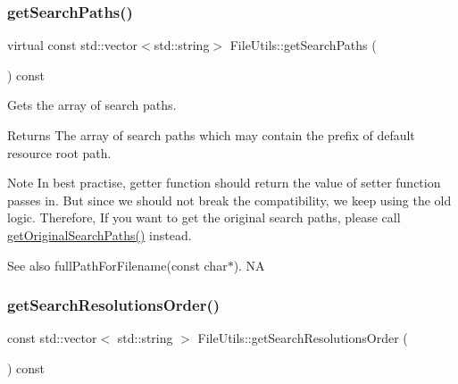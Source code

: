 \subsubsection{\texorpdfstring{get\+Search\+Paths()}{getSearchPaths()}\hspace{0.1cm}{\footnotesize\ttfamily [2/2]}}
{\footnotesize\ttfamily virtual const std\+::vector$<$std\+::string$>$ File\+Utils\+::get\+Search\+Paths (\begin{DoxyParamCaption}{ }\end{DoxyParamCaption}) const\hspace{0.3cm}{\ttfamily [virtual]}}

Gets the array of search paths.

\begin{DoxyReturn}{Returns}
The array of search paths which may contain the prefix of default resource root path. 
\end{DoxyReturn}
\begin{DoxyNote}{Note}
In best practise, getter function should return the value of setter function passes in. But since we should not break the compatibility, we keep using the old logic. Therefore, If you want to get the original search paths, please call \textquotesingle{}\hyperlink{classFileUtils_a43670a0b6631730400ada9ca283bcc80}{get\+Original\+Search\+Paths()}\textquotesingle{} instead. 
\end{DoxyNote}
\begin{DoxySeeAlso}{See also}
full\+Path\+For\+Filename(const char$\ast$).  NA 
\end{DoxySeeAlso}
\mbox{\label{classFileUtils_a079329ce5d4a0154fed6a3987d42dc26}} 
\subsubsection{\texorpdfstring{get\+Search\+Resolutions\+Order()}{getSearchResolutionsOrder()}\hspace{0.1cm}{\footnotesize\ttfamily [1/2]}}
{\footnotesize\ttfamily const std\+::vector$<$ std\+::string $>$ File\+Utils\+::get\+Search\+Resolutions\+Order (\begin{DoxyParamCaption}{ }\end{DoxyParamCaption}) const\hspace{0.3cm}{\ttfamily [virtual]}}


